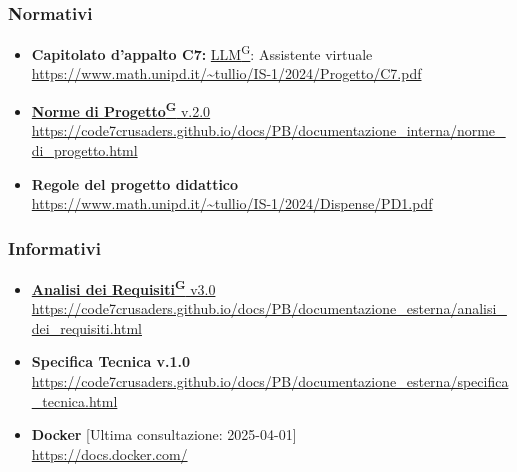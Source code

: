     \subsubsection{Normativi}
        \begin{itemize}
            \item \textbf{Capitolato d'appalto C7:} \href{https://code7crusaders.github.io/docs/PB/documentazione_interna/glossario.html#llm-large-language-model}{LLM\textsuperscript{G}}: Assistente virtuale \\ \url{https://www.math.unipd.it/~tullio/IS-1/2024/Progetto/C7.pdf}
            \item \href{https://code7crusaders.github.io/docs/PB/documentazione_interna/glossario.html#norme-di-progetto}{\textbf{Norme di Progetto\textsuperscript{G}} v.2.0} \\ \url{https://code7crusaders.github.io/docs/PB/documentazione_interna/norme_di_progetto.html}
            \item \textbf{Regole del progetto didattico} \\ \url{https://www.math.unipd.it/~tullio/IS-1/2024/Dispense/PD1.pdf}
        \end{itemize}
    \subsubsection{Informativi}
        \begin{itemize}
            \item \href{https://code7crusaders.github.io/docs/PB/documentazione_interna/glossario.html#analisi-dei-requisiti}{\textbf{Analisi dei Requisiti\textsuperscript{G}} v3.0} \\ \url{https://code7crusaders.github.io/docs/PB/documentazione_esterna/analisi_dei_requisiti.html}
            \item \textbf{Specifica Tecnica v.1.0} \\ \url{https://code7crusaders.github.io/docs/PB/documentazione_esterna/specifica_tecnica.html}
            \item \textbf{Docker} [Ultima consultazione: 2025-04-01] \\ \url{https://docs.docker.com/} 
        \end{itemize}